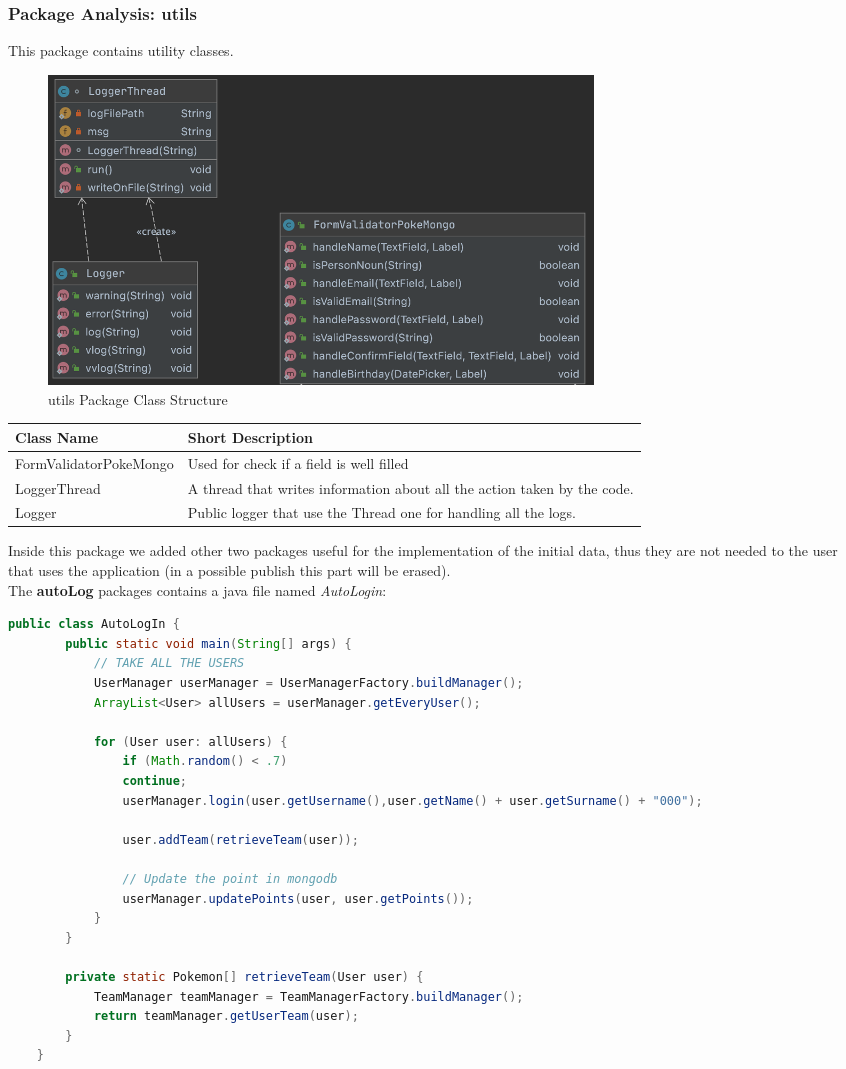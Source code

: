 \subsubsection{Package Analysis: utils}
This package contains utility classes. 
\begin{figure}[H]
	\centering
	\includegraphics[width=0.7\textwidth]{img/utils_package.png}
	\caption{utils Package Class Structure}
\end{figure}
\begingroup
\setlength{\tabcolsep}{10pt} %
\renewcommand{\arraystretch}{1.5} %
\begin{center}
	\begin{longtable}{| m{14em} | m{19em} |} 
		\hline
		\textbf{Class Name} & \textbf{Short Description} \\ [0.5ex] 
		\hline
		FormValidatorPokeMongo & Used for check if a field is well filled\\ 
		\hline
		LoggerThread & A thread that writes information about all the action taken by the code.\\
		\hline
		Logger & Public logger that use the Thread one for handling all the logs.\\
		\hline
	\end{longtable}
\end{center}
\endgroup
Inside this package we added other two packages useful for the implementation of the initial data, thus they are not needed to the user that uses the application (in a possible publish this part will be erased).\\
The \textbf{autoLog} packages contains a java file named \textit{AutoLogin}:
\begin{lstlisting}[language=Java]
	public class AutoLogIn {
		public static void main(String[] args) {
			// TAKE ALL THE USERS
			UserManager userManager = UserManagerFactory.buildManager();
			ArrayList<User> allUsers = userManager.getEveryUser();
			
			for (User user: allUsers) {
				if (Math.random() < .7)
				continue;
				userManager.login(user.getUsername(),user.getName() + user.getSurname() + "000");
				
				user.addTeam(retrieveTeam(user));
				
				// Update the point in mongodb
				userManager.updatePoints(user, user.getPoints());
			}
		}
		
		private static Pokemon[] retrieveTeam(User user) {
			TeamManager teamManager = TeamManagerFactory.buildManager();
			return teamManager.getUserTeam(user);
		}
	}
	
\end{lstlisting}


